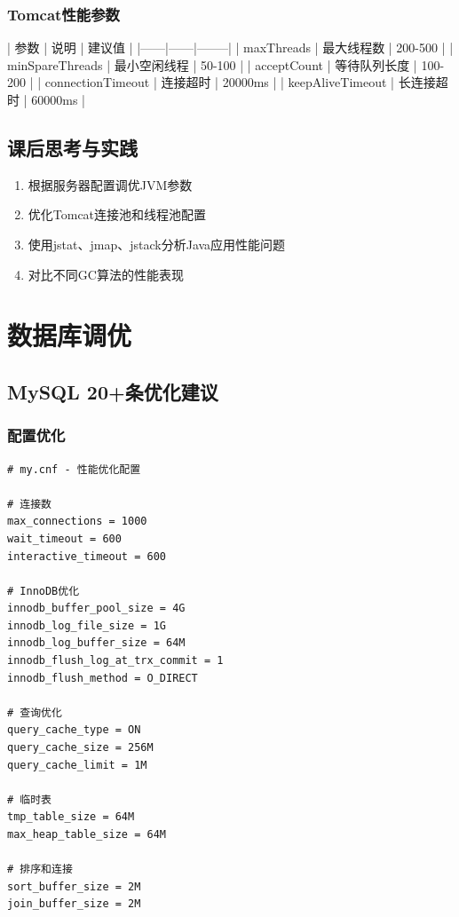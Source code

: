 \documentclass[12pt,UTF8]{ctexbook}
\begin{document}
\subsection*{Tomcat性能参数}

| 参数 | 说明 | 建议值 |
|------|------|--------|
| maxThreads | 最大线程数 | 200-500 |
| minSpareThreads | 最小空闲线程 | 50-100 |
| acceptCount | 等待队列长度 | 100-200 |
| connectionTimeout | 连接超时 | 20000ms |
| keepAliveTimeout | 长连接超时 | 60000ms |

\section{课后思考与实践}
\label{sec:java-tuning-practice}
\begin{enumerate}
    \item 根据服务器配置调优JVM参数
    \item 优化Tomcat连接池和线程池配置
    \item 使用jstat、jmap、jstack分析Java应用性能问题
    \item 对比不同GC算法的性能表现
\end{enumerate}

\chapter{数据库调优}
\label{chap:db-tuning-optimization}

\section{MySQL 20+条优化建议}
\label{sec:mysql-tuning}

\subsection*{配置优化}

\begin{lstlisting}
# my.cnf - 性能优化配置

# 连接数
max_connections = 1000
wait_timeout = 600
interactive_timeout = 600

# InnoDB优化
innodb_buffer_pool_size = 4G
innodb_log_file_size = 1G
innodb_log_buffer_size = 64M
innodb_flush_log_at_trx_commit = 1
innodb_flush_method = O_DIRECT

# 查询优化
query_cache_type = ON
query_cache_size = 256M
query_cache_limit = 1M

# 临时表
tmp_table_size = 64M
max_heap_table_size = 64M

# 排序和连接
sort_buffer_size = 2M
join_buffer_size = 2M
\end{lstlisting}
\end{document}
